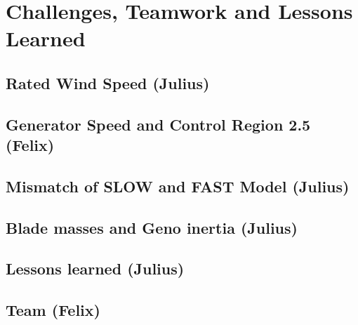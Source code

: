 \chapter{Challenges, Teamwork and Lessons Learned}
\section{Rated Wind Speed (Julius)} \label{RatedWindSpeed}


\section{Generator Speed and Control Region 2.5 (Felix)} \label{Region2d5}


\section{Mismatch of SLOW and FAST Model (Julius)}


\section{Blade masses and Geno inertia (Julius)}


\section{Lessons learned (Julius)}


\section{Team (Felix)}



